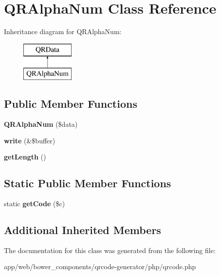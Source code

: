 \hypertarget{class_q_r_alpha_num}{}\section{Q\+R\+Alpha\+Num Class Reference}
\label{class_q_r_alpha_num}
Inheritance diagram for Q\+R\+Alpha\+Num\+:\begin{figure}[H]
\begin{center}
\leavevmode
\includegraphics[height=2.000000cm]{class_q_r_alpha_num}
\end{center}
\end{figure}
\subsection*{Public Member Functions}
\begin{DoxyCompactItemize}
\item 
\mbox{\label{class_q_r_alpha_num_a77cc51a8677c11c7edf37365f5d0c914}} 
{\bfseries Q\+R\+Alpha\+Num} (\$data)
\item 
\mbox{\label{class_q_r_alpha_num_a00c158f7656a161e883417bd57511e3f}} 
{\bfseries write} (\&\$buffer)
\item 
\mbox{\label{class_q_r_alpha_num_a9b3db0b5498f9798e89417c08df01b0e}} 
{\bfseries get\+Length} ()
\end{DoxyCompactItemize}
\subsection*{Static Public Member Functions}
\begin{DoxyCompactItemize}
\item 
\mbox{\label{class_q_r_alpha_num_a3f753be6c0413d4e7deef18410ca3e6b}} 
static {\bfseries get\+Code} (\$c)
\end{DoxyCompactItemize}
\subsection*{Additional Inherited Members}


The documentation for this class was generated from the following file\+:\begin{DoxyCompactItemize}
\item 
app/web/bower\+\_\+components/qrcode-\/generator/php/qrcode.\+php\end{DoxyCompactItemize}
